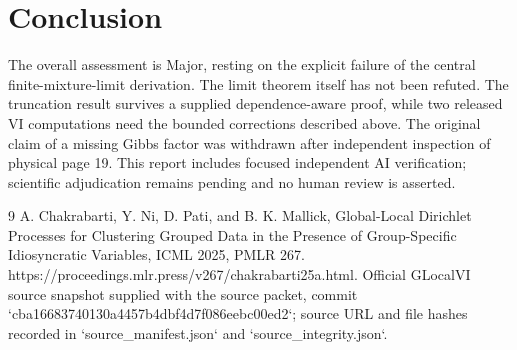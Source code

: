 \documentclass[10pt]{article}
\begin{document}
\section*{Conclusion}
The overall assessment is Major, resting on the explicit failure of the central finite-mixture-limit derivation. The limit theorem itself has not been refuted. The truncation result survives a supplied dependence-aware proof, while two released VI computations need the bounded corrections described above. The original claim of a missing Gibbs factor was withdrawn after independent inspection of physical page 19. This report includes focused independent AI verification; scientific adjudication remains pending and no human review is asserted.\par
9 A. Chakrabarti, Y. Ni, D. Pati, and B. K. Mallick, Global-Local Dirichlet Processes for Clustering Grouped Data in the Presence of Group-Specific Idiosyncratic Variables, ICML 2025, PMLR 267. https://proceedings.mlr.press/v267/chakrabarti25a.html. Official GLocalVI source snapshot supplied with the source packet, commit `cba16683740130a4457b4dbf4d7f086eebc00ed2`; source URL and file hashes recorded in `source\_manifest.json` and `source\_integrity.json`.\par
\end{document}
